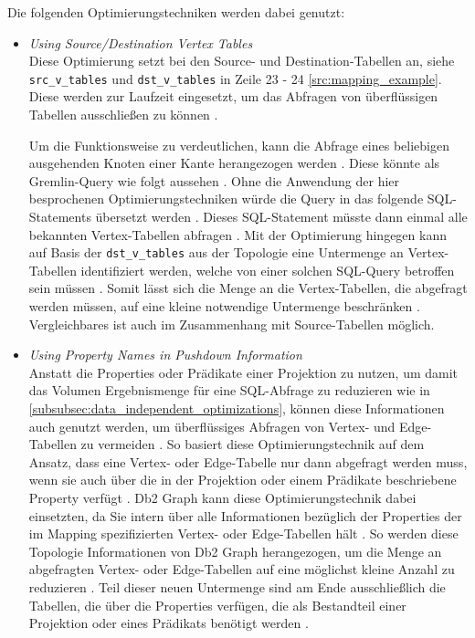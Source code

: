 Die folgenden Optimierungstechniken werden dabei genutzt:
\begin{itemize}
    \item \textit{Using Source/Destination Vertex Tables}\\
    Diese Optimierung setzt bei den Source- und Destination-Tabellen an, siehe \texttt{src\_v\_tables} und \texttt{dst\_v\_tables} in Zeile 23 - 24 \autoref{src:mapping_example}. Diese werden zur Laufzeit eingesetzt, um das Abfragen von überflüssigen Tabellen ausschließen zu können \cite{sigmod_tian}.

    Um die Funktionsweise zu verdeutlichen, kann die Abfrage eines beliebigen ausgehenden Knoten einer Kante herangezogen werden \cite{sigmod_tian}. Diese könnte als Gremlin-Query wie folgt aussehen  \cite{sigmod_tian}. Ohne die Anwendung der hier besprochenen Optimierungstechniken würde die Query in das folgende SQL-Statements übersetzt werden  \cite{sigmod_tian}. Dieses SQL-Statement müsste dann einmal alle bekannten Vertex-Tabellen abfragen \cite{sigmod_tian}. Mit der Optimierung hingegen kann auf Basis der \texttt{dst\_v\_tables} aus der Topologie eine Untermenge an Vertex-Tabellen identifiziert werden, welche von einer solchen SQL-Query betroffen sein müssen \cite{sigmod_tian}. Somit lässt sich die Menge an die Vertex-Tabellen, die abgefragt werden müssen, auf eine kleine notwendige Untermenge beschränken \cite{sigmod_tian}. Vergleichbares ist auch im Zusammenhang mit Source-Tabellen möglich.

    \item \textit{Using Property Names in Pushdown Information}\\
    Anstatt die Properties oder Prädikate einer Projektion zu nutzen, um damit das Volumen Ergebnismenge für eine SQL-Abfrage zu reduzieren wie in \autoref{subsubsec:data_independent_optimizations}, können diese Informationen auch genutzt werden, um überflüssiges Abfragen von Vertex- und Edge-Tabellen zu vermeiden \cite{sigmod_tian}. So basiert diese Optimierungstechnik auf dem Ansatz, dass eine Vertex- oder Edge-Tabelle nur dann abgefragt werden muss, wenn sie auch über die in der Projektion oder einem Prädikate beschriebene Property verfügt \cite{sigmod_tian}. Db2 Graph kann diese Optimierungstechnik dabei einsetzten, da Sie intern über alle Informationen bezüglich der Properties der im Mapping spezifizierten Vertex- oder Edge-Tabellen hält \cite{sigmod_tian}. So werden diese Topologie Informationen von Db2 Graph herangezogen, um die Menge an abgefragten Vertex- oder Edge-Tabellen auf eine möglichst kleine Anzahl zu reduzieren \cite{sigmod_tian}. Teil dieser neuen Untermenge sind am Ende ausschließlich die Tabellen, die über die Properties verfügen, die als Bestandteil einer Projektion oder eines Prädikats benötigt werden \cite{sigmod_tian}.


\end{itemize}
